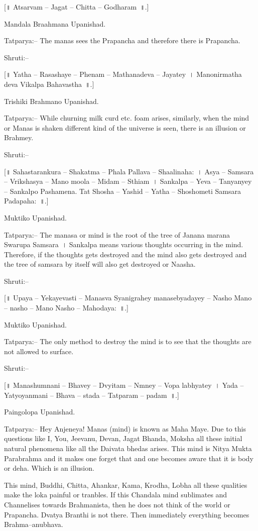 [॥ Atsarvam – Jagat – Chitta – Godharam~॥.]

Mandala Braahmana Upanishad.

Tatparya:– The manas sees the Prapancha and therefore there is Prapancha.

Shruti:–

[॥ Yatha – Rasashaye – Phenam – Mathanadeva – Jayatey~। Manonirmatha deva Vikalpa Bahavastha~॥.]

Trishiki Brahmano Upanishad.

Tatparya:– While churning milk curd etc. foam arises, similarly, when the mind or Manas is shaken different kind of the universe is seen, there is an illusion or Brahmey.

Shruti:–

[॥ Sahastarankura – Shakatma – Phala Pallava – Shaalinaha:~। Asya – Samsara – Vrikshasya – Mano moola – Midam – Sthiam~। Sankalpa – Yeva – Tanyanyey – Sankalpo Pashamena. Tat Shosha – Yashid – Yatha – Shoshometi Samsara Padapaha:~॥.]

Muktiko Upanishad.

Tatparya:– The manasa or mind is the root of the tree of Janana marana Swarupa Samsara~। Sankalpa means various thoughts occurring in the mind. Therefore, if the thoughts gets destroyed and the mind also gets destroyed and the tree of samsara by itself will also get destroyed or Naasha.

Shruti:–

[॥ Upaya – Yekayevasti – Manasva Syanigrahey manasebyadayey – Nasho Mano – nasho – Mano Nasho – Mahodaya:~॥.]

Muktiko Upanishad.

Tatparya:– The only method to destroy the mind is to see that the thoughts are not allowed to surface.

Shruti:–

[॥ Manashumnani – Bhavey – Dvyitam – Nmney – Vopa labhyatey~। Yada – Yatyoyanmani – Bhava – stada – Tatparam – padam~॥.]

Paingolopa Upanishad.

Tatparya:– Hey Anjeneya! Manas (mind) is known as Maha Maye. Due to this questions like I, You, Jeevanu, Devan, Jagat Bhanda, Moksha all these initial natural phenomena like all the Daivata bhedas arises. This mind is Nitya Mukta Parabrahma and it makes one forget that and one becomes aware that it is body or deha. Which is an illusion.

This mind, Buddhi, Chitta, Ahankar, Kama, Krodha, Lobha all these qualities make the loka painful or tranbles. If this Chandala mind sublimates and Channelises towards Brahmanista, then he does not think of the world or Prapancha. Dvatya Branthi is not there. Then immediately everything becomes Brahma–anubhava.


